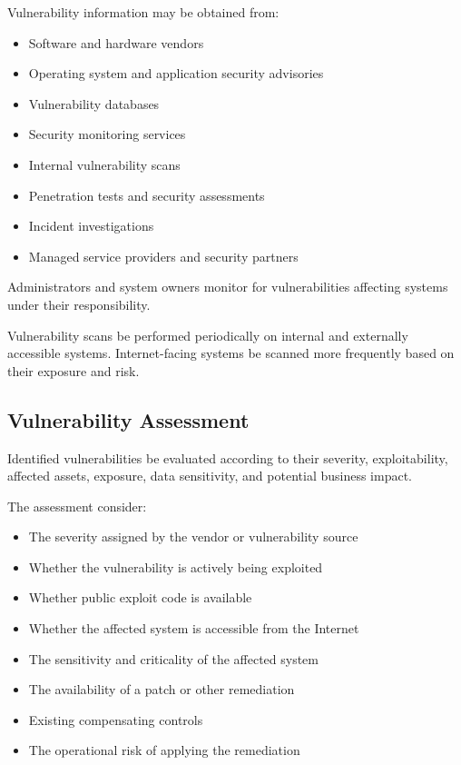 Vulnerability information may be obtained from:
\begin{itemize}
    \item Software and hardware vendors
    \item Operating system and application security advisories
    \item Vulnerability databases
    \item Security monitoring services
    \item Internal vulnerability scans
    \item Penetration tests and security assessments
    \item Incident investigations
    \item Managed service providers and security partners
\end{itemize}

Administrators and system owners \must{} monitor for vulnerabilities affecting systems under their responsibility.

Vulnerability scans \should{} be performed periodically on internal and externally accessible systems. Internet-facing systems \should{} be scanned more frequently based on their exposure and risk.

\subsection{Vulnerability Assessment}

Identified vulnerabilities \must{} be evaluated according to their severity, exploitability, affected assets, exposure, data sensitivity, and potential business impact.

The assessment \should{} consider:
\begin{itemize}
    \item The severity assigned by the vendor or vulnerability source
    \item Whether the vulnerability is actively being exploited
    \item Whether public exploit code is available
    \item Whether the affected system is accessible from the Internet
    \item The sensitivity and criticality of the affected system
    \item The availability of a patch or other remediation
    \item Existing compensating controls
    \item The operational risk of applying the remediation
\end{itemize}

